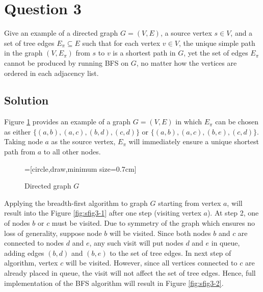 

\section*{Question 3}

Give an example of a directed graph $G = (V, E)$, a source vertex $s \in V$, and a set of tree edges $E_\pi \subseteq E$ such that for each vertex $v \in V$, the unique simple path in the graph $(V, E_\pi)$ from $s$ to $v$ is a shortest path in $G$, yet the set of edges $E_\pi$ cannot be produced by running BFS on $G$, no matter how the vertices are ordered in each adjacency list.

\subsection*{Solution}

Figure \ref{fig31} provides an example of a graph $G = (V, E)$ in which $E_\pi$ can be chosen as either $\{(a,b), (a,c), (b,d), (c,d)\}$ or $\{(a,b), (a,c), (b,e), (c,d)\}$. Taking node $a$ as the source vertex, $E_\pi$ will immediately ensure a unique shortest path from $a$ to all other nodes.

\begin{figure}[H]\centering
{}=[circle,draw,minimum size=0.7cm]
\caption{Directed graph $G$}\label{fig31}
\end{figure}

Applying the breadth-first algorithm to graph $G$ starting from vertex $a$, will result into the Figure \ref{fig:sfig3-1} after one step (visiting vertex $a$). At step 2, one of nodes $b$ or $c$ must be visited. Due to symmetry of the graph which ensures no loss of generality, suppose node $b$ will be visited. Since both nodes $b$ and $c$ are connected to nodes $d$ and $e$, any such visit will put nodes $d$ and $e$ in queue, adding edges $(b,d)$ and $(b,e)$ to the set of tree edges. In next step of algorithm, vertex $c$ will be visited. However, since all vertices connected to $c$ are already placed in queue, the visit will not affect the set of tree edges. Hence, full implementation of the BFS algorithm will result in Figure \ref{fig:sfig3-2}.

